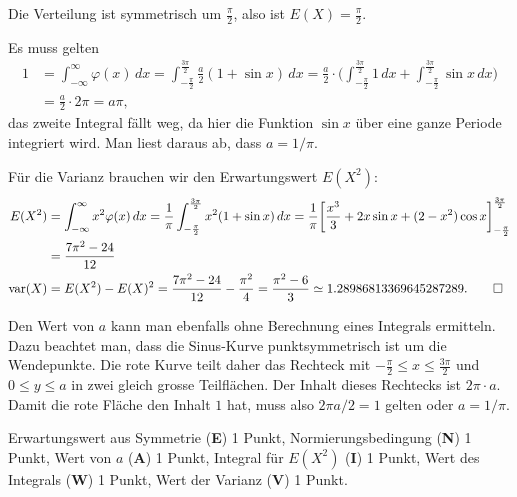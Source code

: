 \begin{loesung}
\begin{teilaufgaben}
\item
Die Verteilung ist symmetrisch um $\frac{\pi}2$, also ist
$E(X)=\frac{\pi}2$.
\item
Es muss gelten
\begin{align*}
1
&=
\int_{-\infty}^{\infty}\varphi(x)\,dx
=
\int_{-\frac{\pi}2}^{\frac{3\pi}2} \frac{a}2(1+\sin x)\,dx
=
\frac{a}2\cdot \biggl(
\int_{-\frac{\pi}2}^{\frac{3\pi}2} 1\,dx
+
\int_{-\frac{\pi}2}^{\frac{3\pi}2} \sin x\,dx
\biggr)
\\
&=
\frac{a}2\cdot 2\pi
=
a\pi
,
\end{align*}
das zweite Integral fällt weg, da hier die Funktion $\sin x$ über eine
ganze Periode integriert wird.
Man liest daraus ab, dass  $a=1/\pi$.
\item
Für die Varianz brauchen wir den Erwartungswert $E(X^2)$:
\begin{align*}
E(X^2)
&=
\int_{-\infty}^{\infty} x^2\varphi(x)\,dx
=
\frac1{\pi}
\int_{-\frac{\pi}2}^{\frac{3\pi}2} x^2(1+\sin x)\,dx
=
\frac1{\pi}
\biggl[
\frac{x^3}3
+2x\sin x + (2-x^2)\cos x
\biggr]_{-\frac{\pi}2}^{\frac{3\pi}2}
\\
&=
\frac{7\pi^2-24}{12}
\\
\operatorname{var}(X)
&=
E(X^2)-E(X)^2
=
\frac{7\pi^2-24}{12}
-
\frac{\pi^2}{4}
=
\frac{\pi^2-6}{3} \simeq 1.28986813369645287289.
\qedhere
\end{align*}
\end{teilaufgaben}
\end{loesung}


\begin{diskussion}
Den Wert von $a$ kann man ebenfalls ohne Berechnung eines Integrals
ermitteln.
Dazu beachtet man, dass die Sinus-Kurve punktsymmetrisch ist um die
Wendepunkte.
Die rote Kurve teilt daher das Rechteck mit
$-\frac{\pi}2 \le x\le \frac{3\pi}2$ und $0\le y\le a$ in zwei gleich
grosse Teilflächen.
Der Inhalt dieses Rechtecks ist $2\pi\cdot a$.
Damit die rote Fläche den Inhalt $1$ hat, muss also $2\pi a/2 = 1$ gelten
oder $a = 1/\pi$.
\end{diskussion}

\begin{bewertung}
Erwartungswert aus Symmetrie ({\bf E}) 1 Punkt,
Normierungsbedingung ({\bf N}) 1 Punkt,
Wert von $a$ ({\bf A}) 1 Punkt,
Integral für $E(X^2)$ ({\bf I}) 1 Punkt,
Wert des Integrals ({\bf W}) 1 Punkt,
Wert der Varianz ({\bf V}) 1 Punkt.
\end{bewertung}



